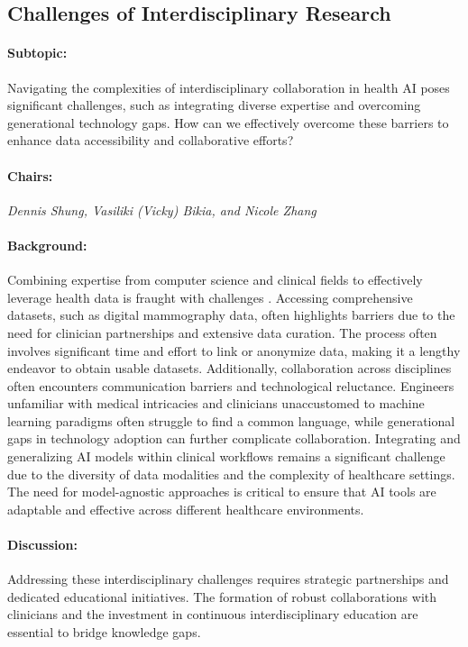\subsection{Challenges of Interdisciplinary Research}

\paragraph{Subtopic:} Navigating the complexities of interdisciplinary collaboration in health AI poses significant challenges, such as integrating diverse expertise and overcoming generational technology gaps. How can we effectively overcome these barriers to enhance data accessibility and collaborative efforts?

\paragraph{Chairs:}
\textit{Dennis Shung, Vasiliki (Vicky) Bikia, and Nicole Zhang}

\paragraph{Background:}
Combining expertise from computer science and clinical fields to effectively leverage health data is fraught with challenges \citep{kelly2019key}. Accessing comprehensive datasets, such as digital mammography data, often highlights barriers due to the need for clinician partnerships and extensive data curation. The process often involves significant time and effort to link or anonymize data, making it a lengthy endeavor to obtain usable datasets. Additionally, collaboration across disciplines often encounters communication barriers and technological reluctance. Engineers unfamiliar with medical intricacies and clinicians unaccustomed to machine learning paradigms often struggle to find a common language, while generational gaps in technology adoption can further complicate collaboration. Integrating and generalizing AI models within clinical workflows remains a significant challenge due to the diversity of data modalities and the complexity of healthcare settings. The need for model-agnostic approaches is critical to ensure that AI tools are adaptable and effective across different healthcare environments.

\paragraph{Discussion:}
Addressing these interdisciplinary challenges requires strategic partnerships and dedicated educational initiatives. The formation of robust collaborations with clinicians and the investment in continuous interdisciplinary education are essential to bridge knowledge gaps. 

